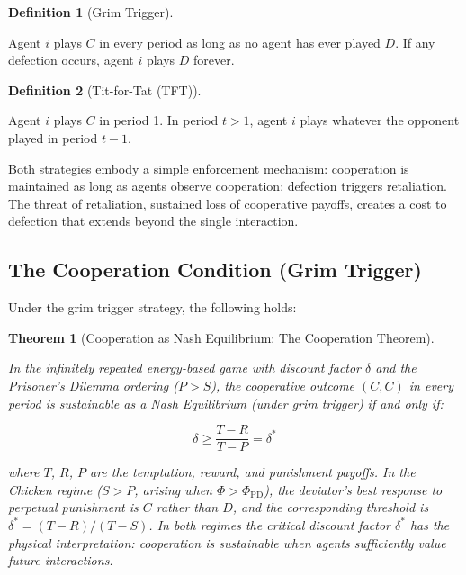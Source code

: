 \documentclass[11pt]{article}
\theoremstyle{plain}
\newtheorem{theorem}{Theorem}
\theoremstyle{definition}
\newtheorem{definition}{Definition}
\theoremstyle{remark}
\let\origsubsection\subsection
\renewcommand{\subsection}{\needspace{7\baselineskip}\origsubsection}
\begin{document}
\begin{definition}[Grim Trigger]
\label{def-grim-trigger}

Agent $i$ plays $C$ in every period as long as no agent has ever played $D$. If any defection occurs, agent $i$ plays $D$ forever.
\end{definition}

\begin{definition}[Tit-for-Tat (TFT)]
\label{def-tit-for-tat}

Agent $i$ plays $C$ in period 1. In period $t > 1$, agent $i$ plays whatever the opponent played in period $t - 1$.
\end{definition}

Both strategies embody a simple enforcement mechanism: cooperation is
maintained as long as agents observe cooperation; defection triggers
retaliation. The threat of retaliation, sustained loss of cooperative
payoffs, creates a cost to defection that extends beyond the single
interaction.

\subsection{The Cooperation Condition (Grim
Trigger)}\label{the-cooperation-condition-grim-trigger}

Under the grim trigger strategy, the following holds:

\begin{theorem}[Cooperation as Nash Equilibrium: The Cooperation Theorem]
\label{thm-cooperation-theorem}

In the infinitely repeated energy-based game with discount factor $\delta$ and the Prisoner's Dilemma ordering ($P > S$), the cooperative outcome $(C, C)$ in every period is sustainable as a Nash Equilibrium (under grim trigger) if and only if:

$$\delta \geq \frac{T - R}{T - P} = \delta^*$$

where $T$, $R$, $P$ are the temptation, reward, and punishment payoffs. In the Chicken regime ($S > P$, arising when $\Phi > \Phi_{\text{PD}}$), the deviator's best response to perpetual punishment is $C$ rather than $D$, and the corresponding threshold is $\delta^* = (T - R)/(T - S)$. In both regimes the critical discount factor $\delta^*$ has the physical interpretation: cooperation is sustainable when agents sufficiently value future interactions.
\end{theorem}
\end{document}

